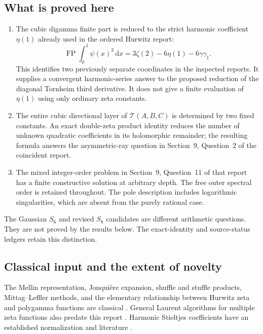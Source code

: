 \documentclass[11pt]{article}
\numberwithin{equation}{section}
\theoremstyle{definition}
\theoremstyle{remark}
\newcommand{\FP}{\operatorname{FP}}
\newcommand{\T}{\mathcal T}
\newcommand{\dd}{\,\mathrm d}
\begin{document}
\subsection{What is proved here}

\begin{enumerate}
\item The cubic digamma finite part is reduced to the strict harmonic
coefficient $\eta(1)$ already used in the ordered Hurwitz report:
\[
 \FP\int_0^1\psi(x)^3\dd x
       =3\zeta(2)-6\eta(1)-6\gamma\gamma_1.
\]
This identifies two previously separate coordinates in the inspected
reports. It supplies a convergent harmonic-series answer to the proposed
reduction of the diagonal Tornheim third derivative. It does not give a
finite evaluation of $\eta(1)$ using only ordinary zeta constants.
\item The entire cubic directional layer of $\T(A,B,C)$ is determined
by two fixed constants. An exact double-zeta product identity reduces
the number of unknown quadratic coefficients in its holomorphic
remainder; the resulting formula answers the asymmetric-ray question
in Section~9, Question~2 of the coincident report.
\item The mixed integer-order problem in Section~9, Question~11 of
that report has a finite constructive solution at arbitrary depth.
The free outer spectral order is retained throughout. The pole
description includes logarithmic singularities, which are absent
from the purely rational case.
\end{enumerate}

The Gaussian $S_6$ and revised $S_8$ candidates are different arithmetic
questions. They are not proved by the results below. The exact-identity
and source-status ledgers retain this distinction.

\subsection{Classical input and the extent of novelty}

The Mellin representation, Jonqui\`ere expansion, shuffle and stuffle
products, Mittag--Leffler methods, and the elementary relationship
between Hurwitz zeta and polygamma functions are classical
\cite{DLMFpolylog,DLMFhurwitz,DLMFgamma,Connon,BorweinDilcher}.
General Laurent algorithms for multiple zeta functions also predate
this report \cite{MOW}. Harmonic Stieltjes coefficients have an
established normalization and literature \cite{Kargin}.
\end{document}
